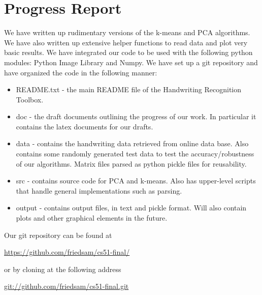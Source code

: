 \documentclass[12pt]{article} %
\begin{document}
\section{Progress Report}

We have written up rudimentary versions of the k-means and PCA algorithms. 
We have also written up extensive helper functions to read data and plot very basic results. 
We have integrated our code to be used with the following python modules: Python Image Library and 
Numpy. We have set up a git repository and have organized the code in the following manner:

	\begin{itemize}
		\item README.txt - the main README file of the Handwriting Recognition Toolbox.
		\item doc - the draft documents outlining the progress of our work. In particular it contains the latex documents for our drafts. 
		\item data - contains the handwriting data retrieved from online data base. Also contains some randomly generated test data to test the accuracy/robustness of our algorithms. Matrix files parsed as python pickle files for reusability. 
		\item src - contains source code for PCA and k-means. Also has upper-level scripts that handle general implementations such as parsing.
		\item output - contains output files, in text and pickle format. Will also contain plots and other graphical elements in the future. 
	\end{itemize}

Our git repository can be found at 

\begin{center}
\url{https://github.com/friedsam/cs51-final/}
\end{center}

or by cloning at the following address 

\begin{center}
\url{git://github.com/friedsam/cs51-final.git}
\end{center}
\end{document}
